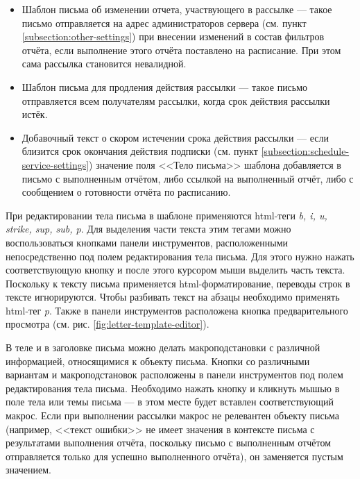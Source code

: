 \documentclass[../user-manual.tex]{subfiles}
\begin{document}
\begin{itemize}
		\item Шаблон письма об изменении отчета, участвующего в рассылке --- такое письмо отправляется на адрес администраторов сервера (см. пункт \ref{subsection:other-settings}) при внесении изменений в состав фильтров отчёта, если выполнение этого отчёта поставлено на расписание. При этом сама рассылка становится невалидной.
		
		\item Шаблон письма для продления действия рассылки --- такое письмо отправляется всем получателям рассылки, когда срок действия рассылки истёк.
		
		\item Добавочный текст о скором истечении срока действия рассылки --- если близится срок окончания действия подписки (см. пункт \ref{subsection:schedule-service-settings}) значение поля <<Тело письма>> шаблона добавляется в письмо с выполненным отчётом, либо ссылкой на выполненный отчёт, либо с сообщением о готовности отчёта по расписанию.
		
	\end{itemize}

	При редактировании тела письма в шаблоне применяются html-теги \textit{b, i, u, strike, sup, sub, p}. Для выделения части текста этим тегами можно воспользоваться кнопками панели инструментов, расположенными непосредственно под полем редактирования тела письма. Для этого нужно нажать соответствующую кнопку и после этого курсором мыши выделить часть текста. Поскольку к тексту письма применяется html-форматирование, переводы строк в тексте игнорируются. Чтобы разбивать текст на абзацы необходимо применять html-тег \textit{p}. Также в панели инструментов расположена кнопка предварительного просмотра (см. рис. \ref{fig:letter-template-editor}).
	
	В теле и в заголовке письма можно делать макроподстановки с различной информацией, относящимися к объекту письма. Кнопки со различными вариантам и макроподстановок расположены в панели инструментов под полем редактирования тела письма. Необходимо нажать кнопку и кликнуть мышью в поле тела или темы письма --- в этом месте будет вставлен соответствующий макрос. Если при выполнении рассылки макрос не релевантен объекту письма (например, <<текст ошибки>> не имеет значения в контексте письма с результатами выполнения отчёта, поскольку письмо с выполненным отчётом отправляется только для успешно выполненного отчёта), он заменяется пустым значением.
	
\end{document}
